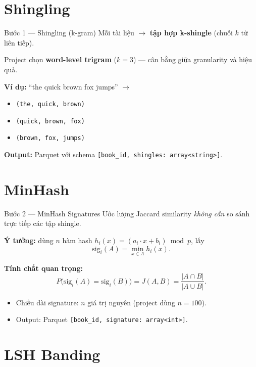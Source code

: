 \documentclass[10pt,aspectratio=169]{beamer}
\begin{document}
\section{Shingling}

\begin{frame}{Bước 1 --- Shingling (k-gram)}
  Mỗi tài liệu $\rightarrow$ \textbf{tập hợp k-shingle} (chuỗi $k$ từ liên tiếp).

  Project chọn \textbf{word-level trigram} ($k=3$) --- cân bằng giữa granularity và hiệu quả.

  \vfill
  \textbf{Ví dụ:} ``the quick brown fox jumps'' $\rightarrow$
  \begin{itemize}
    \item \texttt{(the, quick, brown)}
    \item \texttt{(quick, brown, fox)}
    \item \texttt{(brown, fox, jumps)}
  \end{itemize}

  \vfill
  \textbf{Output:} Parquet với schema \texttt{[book\_id, shingles: array<string>]}.
\end{frame}

\section{MinHash}

\begin{frame}{Bước 2 --- MinHash Signatures}
  Ước lượng Jaccard similarity \emph{không cần} so sánh trực tiếp các tập shingle.

  \textbf{Ý tưởng:} dùng $n$ hàm hash $h_i(x) = (a_i \cdot x + b_i) \bmod p$, lấy
  $$\mathrm{sig}_i(A) = \min_{x \in A} h_i(x).$$

  \textbf{Tính chất quan trọng:}
  $$P\bigl(\mathrm{sig}_i(A) = \mathrm{sig}_i(B)\bigr) = J(A, B) = \frac{|A \cap B|}{|A \cup B|}.$$

  \vfill
  \begin{itemize}
    \item Chiều dài signature: $n$ giá trị nguyên (project dùng $n = 100$).
    \item Output: Parquet \texttt{[book\_id, signature: array<int>]}.
  \end{itemize}
\end{frame}

\section{LSH Banding}
\end{document}

